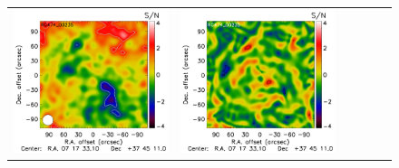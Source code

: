 \documentclass[traditabstract]{aa}
\begin{document}
\begin{figure}[h]
{\begin{tabular}{llllll}
\includegraphics[trim=2.3cm 2.2cm 0cm 0cm, clip=true, scale=1]{Figure/Map_RG474_00235_Ymap_zobs0p4_diff.pdf}  & 
\includegraphics[trim=2.3cm 2.2cm 0cm 0cm, clip=true, scale=1]{Figure/TFcheckGGM_RG474_00235_Ymap_zobs0p4_15_15_45.pdf}  & 

\end{tabular}}
\end{figure}
\end{document}
